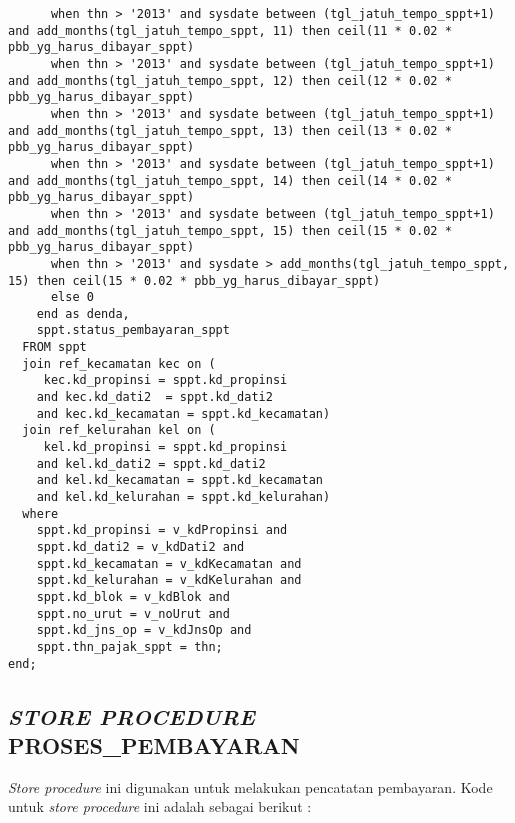 \documentclass[pdftex,12pt, oneside]{article}
\begin{document}
\begin{lstlisting}
      when thn > '2013' and sysdate between (tgl_jatuh_tempo_sppt+1) and add_months(tgl_jatuh_tempo_sppt, 11) then ceil(11 * 0.02 * pbb_yg_harus_dibayar_sppt)
      when thn > '2013' and sysdate between (tgl_jatuh_tempo_sppt+1) and add_months(tgl_jatuh_tempo_sppt, 12) then ceil(12 * 0.02 * pbb_yg_harus_dibayar_sppt)
      when thn > '2013' and sysdate between (tgl_jatuh_tempo_sppt+1) and add_months(tgl_jatuh_tempo_sppt, 13) then ceil(13 * 0.02 * pbb_yg_harus_dibayar_sppt)
      when thn > '2013' and sysdate between (tgl_jatuh_tempo_sppt+1) and add_months(tgl_jatuh_tempo_sppt, 14) then ceil(14 * 0.02 * pbb_yg_harus_dibayar_sppt)
      when thn > '2013' and sysdate between (tgl_jatuh_tempo_sppt+1) and add_months(tgl_jatuh_tempo_sppt, 15) then ceil(15 * 0.02 * pbb_yg_harus_dibayar_sppt)
      when thn > '2013' and sysdate > add_months(tgl_jatuh_tempo_sppt, 15) then ceil(15 * 0.02 * pbb_yg_harus_dibayar_sppt)
      else 0
    end as denda,
    sppt.status_pembayaran_sppt
  FROM sppt
  join ref_kecamatan kec on (
     kec.kd_propinsi = sppt.kd_propinsi
    and kec.kd_dati2  = sppt.kd_dati2
    and kec.kd_kecamatan = sppt.kd_kecamatan)
  join ref_kelurahan kel on (
     kel.kd_propinsi = sppt.kd_propinsi
    and kel.kd_dati2 = sppt.kd_dati2
    and kel.kd_kecamatan = sppt.kd_kecamatan
    and kel.kd_kelurahan = sppt.kd_kelurahan)
  where
    sppt.kd_propinsi = v_kdPropinsi and
    sppt.kd_dati2 = v_kdDati2 and
    sppt.kd_kecamatan = v_kdKecamatan and
    sppt.kd_kelurahan = v_kdKelurahan and
    sppt.kd_blok = v_kdBlok and
    sppt.no_urut = v_noUrut and
    sppt.kd_jns_op = v_kdJnsOp and
    sppt.thn_pajak_sppt = thn;
end;
  \end{lstlisting}

\subsection{\textit{STORE PROCEDURE} PROSES\_PEMBAYARAN}

\textit{Store procedure} ini digunakan untuk melakukan pencatatan pembayaran. Kode untuk \textit{store procedure} ini adalah sebagai berikut :
\end{document}

